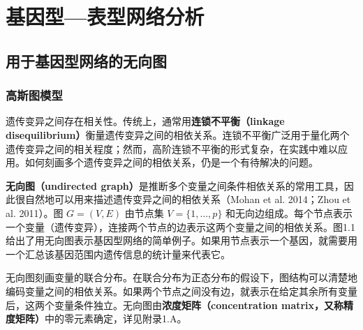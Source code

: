 \chapter{基因型—表型网络分析}
\label{ch:genotype-phenotype}

\section{用于基因型网络的无向图}
\subsection{高斯图模型}

遗传变异之间存在相关性。传统上，通常用\textbf{连锁不平衡（linkage disequilibrium）}衡量遗传变异之间的相依关系。连锁不平衡广泛用于量化两个遗传变异之间的相关程度；然而，高阶连锁不平衡的形式复杂，在实践中难以应用。如何刻画多个遗传变异之间的相依关系，仍是一个有待解决的问题。

\textbf{无向图（undirected graph）}是推断多个变量之间条件相依关系的常用工具，因此很自然地可以用来描述遗传变异之间的相依关系（Mohan et al. 2014；Zhou et al. 2011）。图 $G=(V,E)$ 由节点集 $V=\{1,\ldots,p\}$ 和无向边组成。每个节点表示一个变量（遗传变异），连接两个节点的边表示这两个变量之间的相依关系。图1.1给出了用无向图表示基因型网络的简单例子。如果用节点表示一个基因，就需要用一个汇总该基因范围内遗传信息的统计量来代表它。

无向图刻画变量的联合分布。在联合分布为正态分布的假设下，图结构可以清楚地编码变量之间的相依关系。如果两个节点之间没有边，就表示在给定其余所有变量后，这两个变量条件独立。无向图由\textbf{浓度矩阵（concentration matrix，又称精度矩阵）}中的零元素确定，详见附录1.A。

\begin{figure}[htbp]
\centering
{}
\end{figure}

